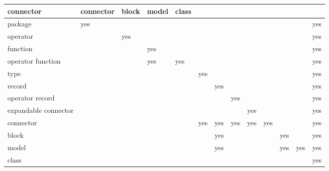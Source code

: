 \documentclass[10pt,a4paper]{report}
\begin{document}
{\begin{longtable}[]{|l|l|l|l|l|l|l|l|l|l|l|l|l|}
\begin{minipage}[t]{0.05\columnwidth}
connector\strut
\end{minipage} & \begin{minipage}[t]{0.05\columnwidth}\raggedright
connector\strut
\end{minipage} & \begin{minipage}[t]{0.05\columnwidth}\raggedright
block\strut
\end{minipage} & \begin{minipage}[t]{0.05\columnwidth}\raggedright
model\strut
\end{minipage} & \begin{minipage}[t]{0.05\columnwidth}\raggedright
class\strut
\end{minipage}\\ \hline
package & yes & & & & & & & & & & & \cellcolor{gray}yes\\ \hline
operator & & yes & & & & & & & & & & \cellcolor{gray}yes\\ \hline
function & & & yes & & & & & & & & &\cellcolor{gray} yes\\ \hline
\begin{minipage}[t]{0.05\columnwidth}\raggedright
operator
function\strut
\end{minipage}
 & & & \cellcolor{gray} yes & yes & & & & & & & & yes\\ \hline
type & & & & & yes & & & & & & & yes\\ \hline
record & & & & & & yes & & & & & & yes\\ \hline
\begin{minipage}[t]{0.05\columnwidth}\raggedright
operator
record\strut
\end{minipage} & & & & & & & yes & & & & & yes \\ \hline
\begin{minipage}[t]{0.05\columnwidth}\raggedright
expandable
connector\strut
\end{minipage} & & & & & & & & yes & & & & yes \\ \hline
connector & & & & & \cellcolor{gray}yes &\cellcolor{gray} yes &\cellcolor{gray} yes &\cellcolor{gray} yes & yes & & & \cellcolor{gray}yes\\ \hline
block & & & & & &\cellcolor{gray} yes & & & & yes & & \cellcolor{gray}yes\\ \hline
model & & & & & & \cellcolor{gray}yes & & & & \cellcolor{gray}yes & yes & \cellcolor{gray}yes\\ \hline
class & & & & & & & & & & & & yes\\ \hline
\end{longtable}
}
\end{document}
